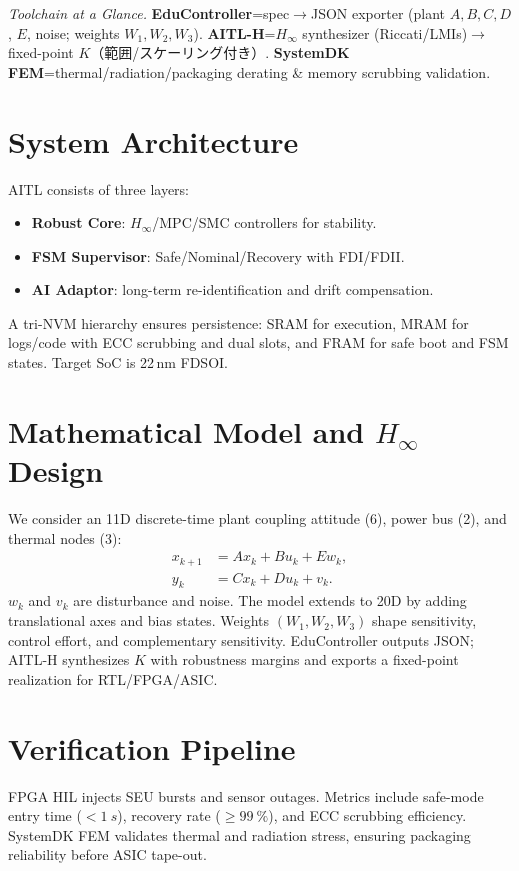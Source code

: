 \documentclass[conference]{IEEEtran}
\begin{document}
\noindent\textit{Toolchain at a Glance.}
\textbf{EduController}=\;spec$\to$JSON exporter (plant $A,B,C,D$, $E$, noise; weights $W_1,W_2,W_3$). 
\textbf{AITL-H}=\;$H_\infty$ synthesizer (Riccati/LMIs)$\to$ fixed-point $K$（範囲/スケーリング付き）. 
\textbf{SystemDK FEM}=\;thermal/radiation/packaging derating \& memory scrubbing validation.

\section{System Architecture}
AITL consists of three layers:
\begin{itemize}
  \item \textbf{Robust Core}: $H_\infty$/MPC/SMC controllers for stability.
  \item \textbf{FSM Supervisor}: Safe/Nominal/Recovery with FDI/FDII.
  \item \textbf{AI Adaptor}: long-term re-identification and drift compensation.
\end{itemize}
A tri-NVM hierarchy ensures persistence: SRAM for execution, MRAM for logs/code with ECC scrubbing and dual slots, and FRAM for safe boot and FSM states. Target SoC is 22\,nm FD\!SOI.

\section{Mathematical Model and \texorpdfstring{$H_\infty$}{H-infinity} Design}
We consider an 11D discrete-time plant coupling attitude (6), power bus (2), and thermal nodes (3):
\begin{align}
  x_{k+1} &= A x_k + B u_k + E w_k, \label{eq:ss1}\\
  y_k &= C x_k + D u_k + v_k. \label{eq:ss2}
\end{align}
$w_k$ and $v_k$ are disturbance and noise. The model extends to 20D by adding translational axes and bias states. Weights $(W_1,W_2,W_3)$ shape sensitivity, control effort, and complementary sensitivity. EduController outputs JSON; AITL-H synthesizes $K$ with robustness margins and exports a fixed-point realization for RTL/FPGA/ASIC.

\section{Verification Pipeline}
FPGA HIL injects SEU bursts and sensor outages. Metrics include safe-mode entry time ($<\SI{1}{s}$), recovery rate ($\ge\SI{99}{\percent}$), and ECC scrubbing efficiency. SystemDK FEM validates thermal and radiation stress, ensuring packaging reliability before ASIC tape-out.
\end{document}
